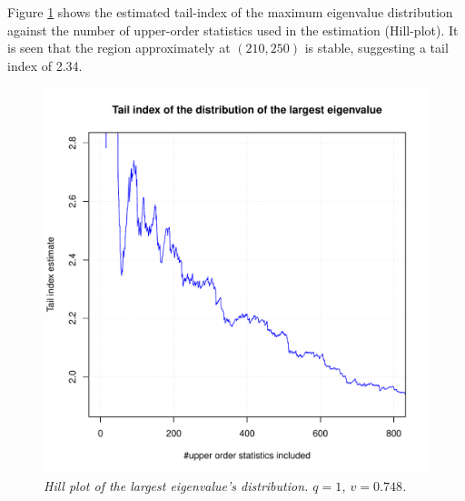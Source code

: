 \documentclass{article}
\begin{document}
\pagebreak
Figure \ref{fig:eigmax_HillPlot} shows the estimated tail-index of the
maximum eigenvalue distribution against the number of upper-order
statistics used in the estimation (Hill-plot). It is seen that the
region approximately at $(210, 250)$ is stable, suggesting a tail
index of 2.34.
\begin{figure}[htb!]
  \centering
  \includegraphics[scale=0.5]{../r/TailIndex_eignmax_q1dot0_v0dot748.pdf}
  \caption{\small \it Hill plot of the largest eigenvalue's
    distribution. $q = 1$, $v = 0.748$.}
  \label{fig:eigmax_HillPlot}
\end{figure}
\end{document}
